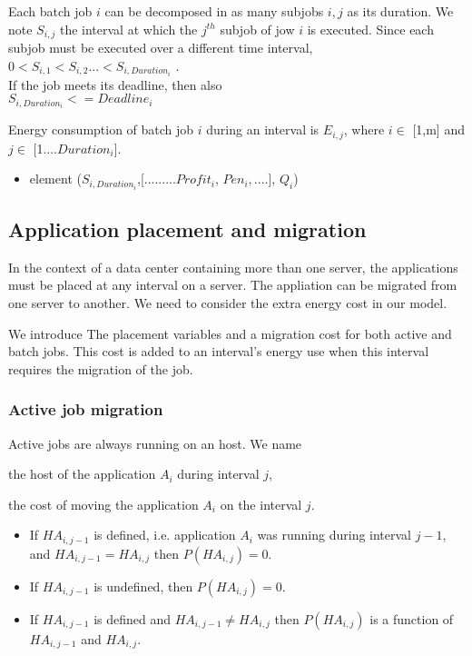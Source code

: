 \documentclass[a4paper]{article}
\begin{document}
Each batch job $i$ can be decomposed in as many subjobs $i,j$ as its duration. We note $S_{i,j}$ the interval at which the $j^{th}$ subjob of jow $i$ is executed.
Since each subjob must be executed over a different time interval,\\
$0< S_{i,1}<S_{i,2}$...$<S_{i,Duration_i}$ .\\
If the job meets its deadline, then also\\
$S_{i,Duration_i}<=Deadline_i$

Energy consumption of batch job $i$ during an interval is $E_{i,j}$, where $i\in$ [1,m] and $j\in$ [1....$Duration_i$]. 
\begin{itemize}
 \item element ($S_{i,Duration_i}$,[.........$Profit_i$, $Pen_i,....$], $Q_i$)
\end{itemize}


\subsection{Application placement and migration}

In the context of a data center containing more than one server, the applications must be placed at any interval on a server.
The appliation can be migrated from one server to another. We need to consider the extra energy cost in our model.

We introduce The placement variables and a migration cost for both active and batch jobs. This cost is added to an interval's energy use when this interval requires the migration of the job.


\subsubsection{Active job migration}

Active jobs are always running on an host. We name

\begin{description}[labelwidth=4em,align=left,labelindent=2em]
	\item[$HA_{i,j}$] the host of the application $A_i$ during interval $j$,
	\item[$PHA_{i,j}$] the cost of moving the application $A_i$ on the interval $j$.
 		\begin{itemize}
			\item If $HA_{i,j-1}$ is defined, i.e. application $A_i$ was running during interval $j-1$, and $HA_{i,j-1} = HA_{i,j}$ then $P(HA_{i,j}) = 0$.
			\item If $HA_{i,j-1}$ is undefined, then $P(HA_{i,j}) = 0$.
			\item If $HA_{i,j-1}$ is defined and $HA_{i,j-1} \neq HA_{i,j}$ then $P(HA_{i,j})$ is a function of $HA_{i,j-1}$ and $HA_{i,j}$.
		\end{itemize}
\end{description}
\end{document}
